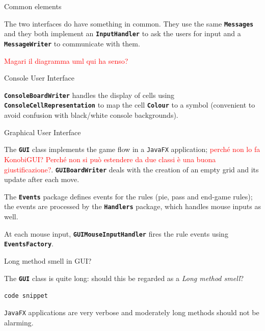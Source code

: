 \documentclass{beamer}
\begin{document}
  \begin{frame} {Common elements}

    The two interfaces do have something in common. They use the same \texttt{\textbf{Messages}} and they both implement an \textbf{\texttt{InputHandler}} to ask the users for input and a \textbf{\texttt{MessageWriter}} to communicate with them.

    \vspace{1em}

    \textcolor{red}{Magari il diagramma uml qui ha senso?}

  \end{frame}




  \begin{frame}{Console User Interface}

    \textbf{\texttt{ConsoleBoardWriter}} handles the display of cells using \textbf{\texttt{ConsoleCellRepresentation}} to map the cell \textbf{\texttt{Colour}} to a symbol (convenient to avoid confusion with black/white console backgrounds).

  \end{frame}



  \begin{frame}{Graphical User Interface}


    The \textbf{\texttt{GUI}} class implements the game flow in a \texttt{JavaFX} application; \textcolor{red}{perché non lo fa KonobiGUI? Perché non si può estendere da due classi è una buona giustificazione?}. \textbf{\texttt{GUIBoardWriter}} deals with the creation of an empty grid and its update after each move.

    \vspace{1em}

    The \textbf{\texttt{Events}} package defines events for the rules (pie, pass and end-game rules); the events are processed by the \textbf{\texttt{Handlers}} package, which handles mouse inputs as well.

    \vspace{1em}

    At each mouse input, \textbf{\texttt{GUIMouseInputHandler}} fires the rule events using \textbf{\texttt{EventsFactory}}.

  \end{frame}



  \begin{frame}{Long method smell in GUI?}

    The \textbf{\texttt{GUI}} class is quite long: should this be regarded as a \textit{Long method smell}?

    \vspace{1em}

    \texttt{code snippet}

    \vspace{1em}

    \texttt{JavaFX} applications are very verbose and moderately long methods should not be alarming.

  \end{frame}
\end{document}
